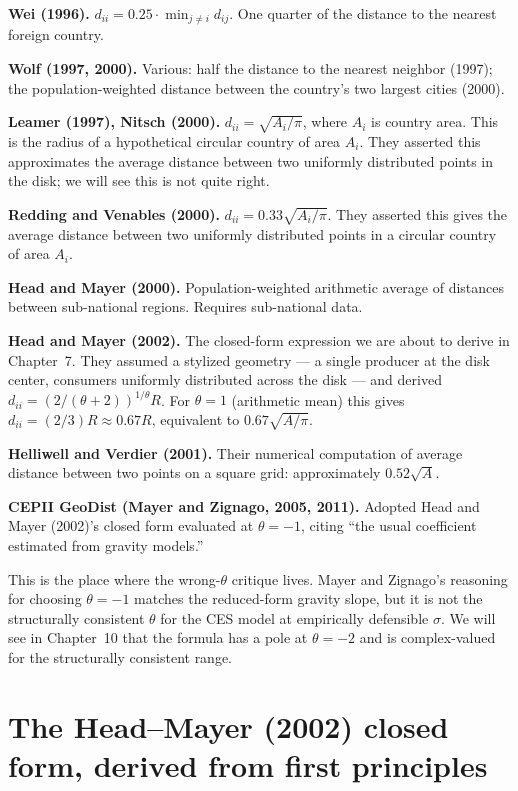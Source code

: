 \documentclass[11pt,letterpaper,oneside]{book}
\theoremstyle{definition}
\theoremstyle{remark}
\begin{document}
\textbf{Wei (1996).} $d_{ii} = 0.25 \cdot \min_{j \neq i} d_{ij}$. One quarter of the distance to the nearest foreign country.

\textbf{Wolf (1997, 2000).} Various: half the distance to the nearest neighbor (1997); the population-weighted distance between the country's two largest cities (2000).

\textbf{Leamer (1997), Nitsch (2000).} $d_{ii} = \sqrt{A_i/\pi}$, where $A_i$ is country area. This is the radius of a hypothetical circular country of area $A_i$. They asserted this approximates the average distance between two uniformly distributed points in the disk; we will see this is not quite right.

\textbf{Redding and Venables (2000).} $d_{ii} = 0.33 \sqrt{A_i/\pi}$. They asserted this gives the average distance between two uniformly distributed points in a circular country of area $A_i$.

\textbf{Head and Mayer (2000).} Population-weighted arithmetic average of distances between sub-national regions. Requires sub-national data.

\textbf{Head and Mayer (2002).} The closed-form expression we are about to derive in Chapter~7. They assumed a stylized geometry --- a single producer at the disk center, consumers uniformly distributed across the disk --- and derived $d_{ii} = (2/(\theta+2))^{1/\theta} R$. For $\theta = 1$ (arithmetic mean) this gives $d_{ii} = (2/3)R \approx 0.67 R$, equivalent to $0.67 \sqrt{A/\pi}$.

\textbf{Helliwell and Verdier (2001).} Their numerical computation of average distance between two points on a square grid: approximately $0.52 \sqrt{A}$.

\textbf{CEPII GeoDist (Mayer and Zignago, 2005, 2011).} Adopted Head and Mayer (2002)'s closed form evaluated at $\theta = -1$, citing ``the usual coefficient estimated from gravity models.''

This is the place where the wrong-$\theta$ critique lives. Mayer and Zignago's reasoning for choosing $\theta = -1$ matches the reduced-form gravity slope, but it is not the structurally consistent $\theta$ for the CES model at empirically defensible $\sigma$. We will see in Chapter~10 that the formula has a pole at $\theta = -2$ and is complex-valued for the structurally consistent range.

\chapter{The Head--Mayer (2002) closed form, derived from first principles}
\end{document}
